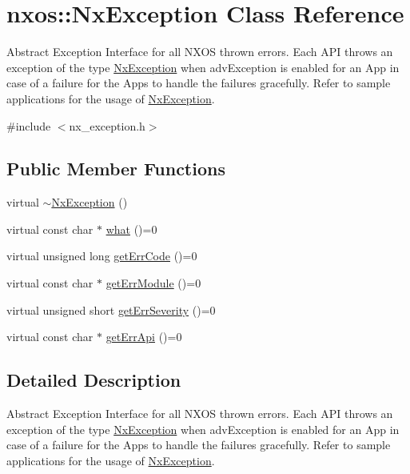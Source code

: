\hypertarget{classnxos_1_1_nx_exception}{}\section{nxos\+:\+:Nx\+Exception Class Reference}
\label{classnxos_1_1_nx_exception}


Abstract Exception Interface for all N\+X\+OS thrown errors. Each A\+PI throws an exception of the type \mbox{\hyperlink{classnxos_1_1_nx_exception}{Nx\+Exception}} when adv\+Exception is enabled for an App in case of a failure for the Apps to handle the failures gracefully. Refer to sample applications for the usage of \mbox{\hyperlink{classnxos_1_1_nx_exception}{Nx\+Exception}}.  




{\ttfamily \#include $<$nx\+\_\+exception.\+h$>$}

\subsection*{Public Member Functions}
\begin{DoxyCompactItemize}
\item 
virtual \mbox{\hyperlink{classnxos_1_1_nx_exception_a2063f2937b4fdfe7a2e58f0ce727d70c}{$\sim$\+Nx\+Exception}} ()
\item 
virtual const char $\ast$ \mbox{\hyperlink{classnxos_1_1_nx_exception_ad475b90fb193848245b9537524439943}{what}} ()=0
\item 
virtual unsigned long \mbox{\hyperlink{classnxos_1_1_nx_exception_ace42c480c5b1efc0779028339a09f067}{get\+Err\+Code}} ()=0
\item 
virtual const char $\ast$ \mbox{\hyperlink{classnxos_1_1_nx_exception_ad428a765217581f320af95386350ef30}{get\+Err\+Module}} ()=0
\item 
virtual unsigned short \mbox{\hyperlink{classnxos_1_1_nx_exception_a7b5ffd11c04e3955d874ea7a6b18063f}{get\+Err\+Severity}} ()=0
\item 
virtual const char $\ast$ \mbox{\hyperlink{classnxos_1_1_nx_exception_a82ce0a75c61b55ca191c86e5abfeaa20}{get\+Err\+Api}} ()=0
\end{DoxyCompactItemize}


\subsection{Detailed Description}
Abstract Exception Interface for all N\+X\+OS thrown errors. Each A\+PI throws an exception of the type \mbox{\hyperlink{classnxos_1_1_nx_exception}{Nx\+Exception}} when adv\+Exception is enabled for an App in case of a failure for the Apps to handle the failures gracefully. Refer to sample applications for the usage of \mbox{\hyperlink{classnxos_1_1_nx_exception}{Nx\+Exception}}. 

